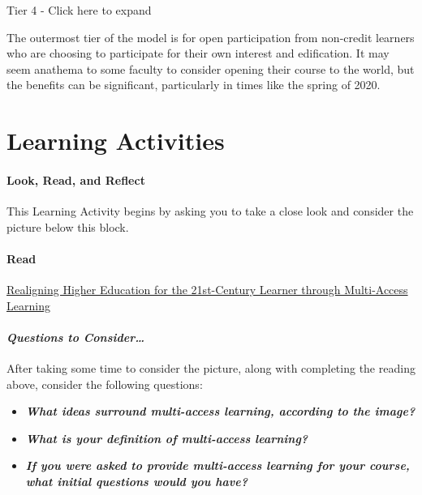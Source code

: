 \documentclass[
]{book}
\providecommand{\tightlist}{%
  \setlength{\itemsep}{0pt}\setlength{\parskip}{0pt}}
\begin{document}
Tier 4 - Click here to expand

The outermost tier of the model is for open participation from non-credit learners who are choosing to participate for their own interest and edification. It may seem anathema to some faculty to consider opening their course to the world, but the benefits can be significant, particularly in times like the spring of 2020.

\hypertarget{learning-activities}{%
\section*{Learning Activities}\label{learning-activities}}

\begin{reflect}
\hypertarget{look-read-and-reflect}{%
\paragraph*{Look, Read, and Reflect}\label{look-read-and-reflect}}

This Learning Activity begins by asking you to take a close look and
consider the picture below this block.

\hypertarget{read}{%
\paragraph{Read}\label{read}}

\href{https://jolt.merlot.org/vol9no2/irvine_0613.htm}{Realigning Higher
Education for the 21st-Century Learner through Multi-Access Learning}

\hypertarget{questions-to-consider}{%
\paragraph*{\texorpdfstring{\textbf{\emph{Questions to
Consider\ldots{}}}}{Questions to Consider\ldots{}}}\label{questions-to-consider}}

After taking some time to consider the picture, along with completing
the reading above, consider the following questions:

\begin{itemize}
\tightlist
\item
  \textbf{\emph{What ideas surround multi-access learning, according to
  the image?}}
\item
  \textbf{\emph{What is your definition of multi-access learning?}}
\item
  \textbf{\emph{If you were asked to provide multi-access learning for
  your course, what initial questions would you have?}}
\end{itemize}
\end{reflect}
\end{document}
